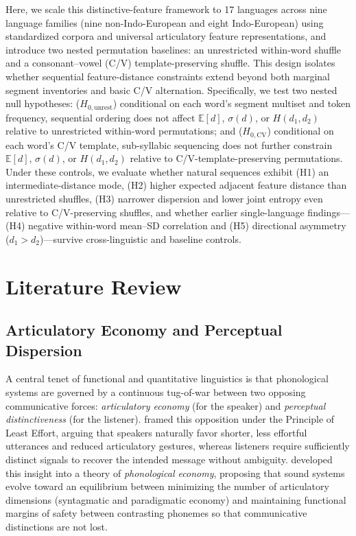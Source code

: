\documentclass[11pt,a4paper,leqno]{article}
\begin{document}
Here, we scale this distinctive-feature framework to 17 languages across nine language families (nine non-Indo-European and eight Indo-European) using standardized corpora and universal articulatory feature representations, and introduce two nested permutation baselines: an unrestricted within-word shuffle and a consonant--vowel (C/V) template-preserving shuffle. This design isolates whether sequential feature-distance constraints extend beyond both marginal segment inventories and basic C/V alternation. Specifically, we test two nested null hypotheses: ($H_{0,\text{unrest}}$) conditional on each word's segment multiset and token frequency, sequential ordering does not affect $\mathbb{E}[d]$, $\sigma(d)$, or $H(d_1, d_2)$ relative to unrestricted within-word permutations; and ($H_{0,\text{CV}}$) conditional on each word's C/V template, sub-syllabic sequencing does not further constrain $\mathbb{E}[d]$, $\sigma(d)$, or $H(d_1, d_2)$ relative to C/V-template-preserving permutations. Under these controls, we evaluate whether natural sequences exhibit (H1) an intermediate-distance mode, (H2) higher expected adjacent feature distance than unrestricted shuffles, (H3) narrower dispersion and lower joint entropy even relative to C/V-preserving shuffles, and whether earlier single-language findings---(H4) negative within-word mean--SD correlation and (H5) directional asymmetry ($d_1 > d_2$)---survive cross-linguistic and baseline controls.

\section{Literature Review}
\subsection{Articulatory Economy and Perceptual Dispersion}
A central tenet of functional and quantitative linguistics is that phonological systems are governed by a continuous tug-of-war between two opposing communicative forces: \emph{articulatory economy} (for the speaker) and \emph{perceptual distinctiveness} (for the listener). \citet{zipf1949} framed this opposition under the Principle of Least Effort, arguing that speakers naturally favor shorter, less effortful utterances and reduced articulatory gestures, whereas listeners require sufficiently distinct signals to recover the intended message without ambiguity. \citet{martinet1955} developed this insight into a theory of \emph{phonological economy}, proposing that sound systems evolve toward an equilibrium between minimizing the number of articulatory dimensions (syntagmatic and paradigmatic economy) and maintaining functional margins of safety between contrasting phonemes so that communicative distinctions are not lost.
\end{document}
